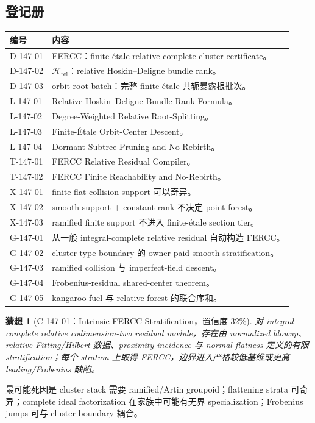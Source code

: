 \documentclass[11pt,a4paper,fontset=fandol]{ctexart}
\newtheorem{conjecture}[theorem]{猜想}
\newcommand{\Hrel}{\mathscr H_{\mathrm{rel}}}
\begin{document}
\subsection{登记册}
\begin{longtable}{p{2.7cm}p{11.8cm}}
\toprule
编号 & 内容\\
\midrule
D-147-01 & FERCC：finite-étale relative complete-cluster certificate。\\
D-147-02 & $\Hrel$：relative Hoskin--Deligne bundle rank。\\
D-147-03 & orbit-root batch：完整 finite-étale 共轭暴露根批次。\\
L-147-01 & Relative Hoskin--Deligne Bundle Rank Formula。\\
L-147-02 & Degree-Weighted Relative Root-Splitting。\\
L-147-03 & Finite-Étale Orbit-Center Descent。\\
L-147-04 & Dormant-Subtree Pruning and No-Rebirth。\\
T-147-01 & FERCC Relative Residual Compiler。\\
T-147-02 & FERCC Finite Reachability and No-Rebirth。\\
X-147-01 & finite-flat collision support 可以奇异。\\
X-147-02 & smooth support + constant rank 不决定 point forest。\\
X-147-03 & ramified finite support 不进入 finite-étale section tier。\\
G-147-01 & 从一般 integral-complete relative residual 自动构造 FERCC。\\
G-147-02 & cluster-type boundary 的 owner-paid smooth stratification。\\
G-147-03 & ramified collision 与 imperfect-field descent。\\
G-147-04 & Frobenius-residual shared-center theorem。\\
G-147-05 & kangaroo fuel 与 relative forest 的联合序和。\\
\bottomrule
\end{longtable}

\begin{conjecture}[C-147-01：Intrinsic FERCC Stratification，置信度 32\%]
对 integral-complete relative codimension-two residual module，存在由 normalized blowup、relative
Fitting/Hilbert 数据、proximity incidence 与 normal flatness 定义的有限 stratification；每个
stratum 上取得 FERCC，边界进入严格较低基维或更高 leading/Frobenius 缺陷。
\end{conjecture}
最可能死因是 cluster stack 需要 ramified/Artin groupoid；flattening strata 可奇异；complete
ideal factorization 在家族中可能有无界 specialization；Frobenius jumps 可与 cluster boundary 耦合。
\end{document}
